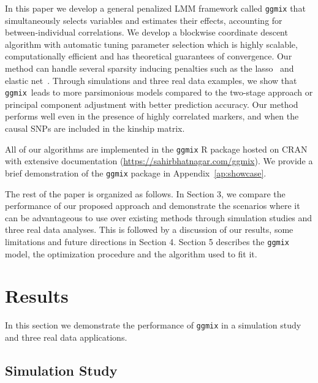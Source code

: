 \documentclass[10pt,letterpaper]{article}
\newcommand{\ggmix}{\texttt{ggmix}}
\begin{document}
In this paper we develop a general penalized LMM framework called \texttt{ggmix} that simultaneously selects variables and estimates their effects, accounting for between-individual correlations. We develop a blockwise coordinate descent algorithm with automatic tuning parameter selection which is highly scalable, computationally efficient and has theoretical guarantees of convergence. Our method can handle several sparsity inducing penalties such as the lasso~\cite{tibshirani1996regression} and elastic net~\cite{zou2005regularization}. Through simulations and three real data examples, we show that \ggmix ~leads to more parsimonious models compared to the two-stage approach or principal component adjustment with better prediction accuracy. Our method performs well even in the presence of highly correlated markers, and when the causal SNPs are included in the kinship matrix. 

All of our algorithms are implemented in the \texttt{ggmix} R package hosted on CRAN with extensive documentation (\url{https://sahirbhatnagar.com/ggmix}). We provide a brief demonstration of the \texttt{ggmix} package in Appendix~\ref{ap:showcase}.

The rest of the paper is organized as follows. In Section 3, we compare the performance of our proposed approach and demonstrate the scenarios where it can be advantageous to use over existing methods through simulation studies and three real data analyses. This is followed by a discussion of our results, some limitations and future directions in Section 4. Section 5 describes the \texttt{ggmix} model, the optimization procedure and the algorithm used to fit it.





\section*{Results}\label{sec:results}

In this section we demonstrate the performance of \texttt{ggmix} in a simulation study and three real data applications. 

\subsection*{Simulation Study} \label{simustudy}
\end{document}
